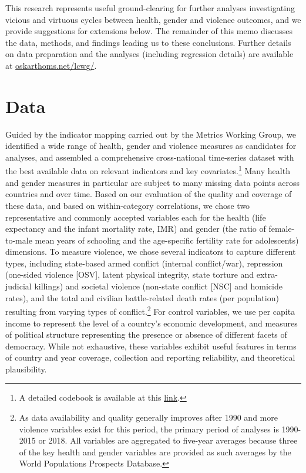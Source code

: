 \documentclass[12pt]{article}
\begin{document}
This research represents useful ground-clearing for further analyses investigating vicious and virtuous cycles between health, gender and violence outcomes, and we provide suggestions for extensions below.
The remainder of this memo discusses the data, methods, and findings leading us to these conclusions. Further details on data preparation and the analyses (including regression details) are available at \href{oskarthoms.net/lcwg/}{oskarthoms.net/lcwg/}.


\section{Data}


Guided by the indicator mapping carried out by the Metrics Working Group, we identified a wide range of health, gender and violence measures as candidates for analyses, and assembled a comprehensive cross-national time-series dataset with the best available data on relevant indicators and key covariates.\footnote{A detailed codebook is available at this \href{https://docs.google.com/spreadsheets/d/1KLFTva--XHVBM-IX6qaPtuyzmIlRMnpyjUXfBdJPsag/edit?usp=sharing}{link}.} Many health and gender measures in particular are subject to many missing data points across countries and over time.
Based on our evaluation of the quality and coverage of these data, and based on within-category correlations, we chose two representative and commonly accepted variables each for the health (life expectancy and the infant mortality rate, IMR) and gender (the ratio of female-to-male mean years of schooling and the age-specific fertility rate for adolescents) dimensions.
To measure violence, we chose several indicators to capture different types, including state-based armed conflict (internal conflict/war), repression (one-sided violence [OSV], latent physical integrity, state torture and extra-judicial killings) and societal violence (non-state conflict [NSC] and homicide rates), and the total and civilian battle-related death rates (per population) resulting from varying types of conflict.\footnote{As data availability and quality generally improves after 1990 and more violence variables exist for this period, the primary period of analyses is 1990-2015 or 2018. All variables are aggregated to five-year averages because three of the key health and gender variables are provided as such averages by the World Populations Prospects Database.}
For control variables, we use per capita income to represent the level of a country's economic development, and measures of political structure representing the presence or absence of different facets of democracy.
While not exhaustive, these variables exhibit useful features in terms of country and year coverage, collection and reporting reliability, and theoretical plausibility.
\end{document}

